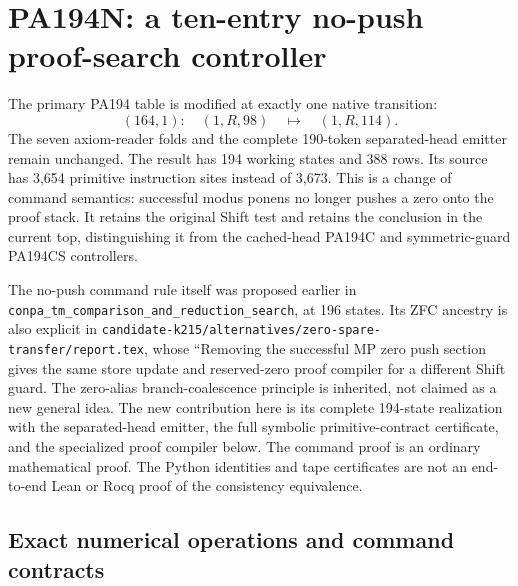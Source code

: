 \section{PA194N: a ten-entry no-push proof-search controller}
\label{sec:np-controller}

The primary PA194 table is modified at exactly one native transition:
\[
 (164,1):\quad (1,R,98)\quad\longmapsto\quad(1,R,114).
\]
The seven axiom-reader folds and the complete 190-token separated-head
emitter remain unchanged. The result has 194 working states and 388 rows.
Its source has 3,654 primitive instruction sites instead of 3,673.
This is a change of command semantics: successful modus ponens no longer
pushes a zero onto the proof stack. It retains the original Shift test and
retains the conclusion in the current top, distinguishing it from the
cached-head PA194C and symmetric-guard PA194CS controllers.

The no-push command rule itself was proposed earlier in
\texttt{conpa\_tm\_comparison\_and\_reduction\_search}, at 196 states.
Its ZFC ancestry is also explicit in
\texttt{candidate-k215/alternatives/zero-spare-transfer/report.tex},
whose ``Removing the successful MP zero push section gives the same
store update and reserved-zero proof compiler for a different Shift guard.
The zero-alias branch-coalescence principle is inherited, not claimed
as a new general idea.
The new contribution here is its complete 194-state realization with the
separated-head emitter, the full symbolic primitive-contract certificate,
and the specialized proof compiler below. The command proof is an ordinary
mathematical proof. The Python identities and tape certificates are not an
end-to-end Lean or Rocq proof of the consistency equivalence.

\subsection{Exact numerical operations and command contracts}

